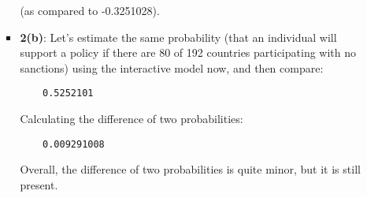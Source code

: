 \documentclass[12pt,letterpaper]{article}
\begin{document}
\begin{enumerate}
\begin{enumerate}
\begin{itemize}
	(as compared to  -0.3251028).
	\item \textbf{2(b)}: Let's estimate the same probability (that an individual will support a policy if there are 80 of 192 countries participating with no sanctions) using the interactive model now, and then compare:
	
	 
	
	\begin{verbatim}
	0.5252101 
	\end{verbatim}
	
	Calculating the difference of two probabilities: 
	
		 
	
		\begin{verbatim}
	0.009291008 
	\end{verbatim}
	
Overall, the difference of two probabilities is quite minor, but it is still present.
	
\end{itemize}


	\end{enumerate}
	\end{enumerate}
\end{document}
